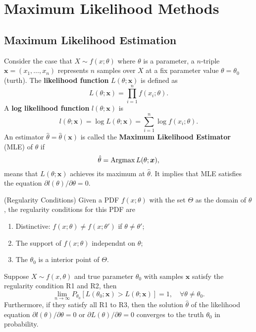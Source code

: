 \section{Maximum Likelihood Methods}

\subsection{Maximum Likelihood Estimation}
\begin{definition}
Consider the case that $X\sim f(x;\theta)$ where $\theta$ is a parameter, a $n$-triple $\boldsymbol{x}=(x_1,\dots,x_n)$ represents $n$ samples over $X$ at a fix parameter value $\theta = \theta_0$ (turth). The \textbf{likelihood function} $L(\theta;\boldsymbol{x})$ is defined as
\begin{equation}
L(\theta;\boldsymbol{x})=\prod_{i=1}^nf(x_i;\theta).
\end{equation}
A \textbf{log likelihood function} $l(\theta;\boldsymbol{x})$ is
\begin{equation}
l(\theta;\boldsymbol{x})=\log L(\theta;\boldsymbol{x})=\sum_{i=1}^n\log f(x_i;\theta).
\end{equation}
An estimator $\hat\theta=\hat\theta(\boldsymbol{x})$ is called the \textbf{Maximum Likelihood Estimator} (MLE) of $\theta$ if
\begin{equation}
\hat \theta =\mathrm{Argmax\,} L(\theta;\boldsymbol{x}),
\end{equation} 
means that $L(\theta;\boldsymbol{x})$ achieves its maximum at $\hat\theta$. It implies that MLE satisfies the equation $\partial l(\theta)/\partial\theta=0$.
\end{definition}

\begin{definition}(Regularity Conditions)
Given a PDF $f(x;\theta)$ with the set $\Theta$ as the domain of $\theta$, the regularity conditions for this PDF are
\begin{enumerate}
	\item Distinctive: $f(x;\theta)\ne f(x;\theta')$ if $\theta\ne\theta'$;
	\item The support of $f(x;\theta)$ independnt on $\theta$;
	\item The $\theta_0$ is a interior point of $\Theta$.
\end{enumerate}
\end{definition}

\begin{theorem}
Suppose $X\sim f(x,\theta)$ and true parameter $\theta_0$ with samples $\boldsymbol{x}$ satisfy the regularity condition R1 and R2, then 
\begin{equation}
\lim_{n\to\infty}P_{\theta_0}[L(\theta_0;\boldsymbol{x})>L(\theta;\boldsymbol{x})]=1,\quad\forall \theta\ne \theta_0.
\end{equation}
Furthermore, if they satisfy all R1 to R3, then the solution $\hat\theta$ of the likelihood equation $\partial l(\theta)/\partial\theta=0$ or $\partial L(\theta)/\partial\theta=0$ converges to the truth $\theta_0$ in probability.
\end{theorem}
